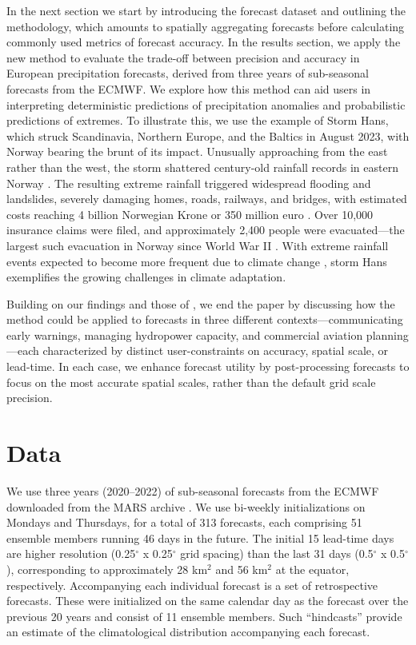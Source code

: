 \documentclass[preprint,12pt,authoryear]{elsarticle}
\begin{document}
In the next section we start by introducing the forecast dataset and outlining the methodology, which amounts to spatially aggregating forecasts before calculating commonly used metrics of forecast accuracy. In the results section, we apply the new method to evaluate the trade-off between precision and accuracy in European precipitation forecasts, derived from three years of sub-seasonal forecasts from the ECMWF. We explore how this method can aid users in interpreting deterministic predictions of precipitation anomalies and probabilistic predictions of extremes. To illustrate this, we use the example of Storm Hans, which struck Scandinavia, Northern Europe, and the Baltics in August 2023, with Norway bearing the brunt of its impact. Unusually approaching from the east rather than the west, the storm shattered century-old rainfall records in eastern Norway \citep{Granerod2023}. The resulting extreme rainfall triggered widespread flooding and landslides, severely damaging homes, roads, railways, and bridges, with estimated costs reaching 4 billion Norwegian Krone or 350 million euro \citep{Ekroll2023}. Over 10,000 insurance claims were filed, and approximately 2,400 people were evacuated—the largest such evacuation in Norway since World War II \citep{KLP2023}. With extreme rainfall events expected to become more frequent due to climate change \citep{Hanssen2009}, storm Hans exemplifies the growing challenges in climate adaptation. 


Building on our findings and those of \cite{RobertsLean2008}, we end the paper by discussing how the method could be applied to forecasts in three different contexts—communicating early warnings, managing hydropower capacity, and commercial aviation planning—each characterized by distinct user-constraints on accuracy, spatial scale, or lead-time. In each case, we enhance forecast utility by post-processing forecasts to focus on the most accurate spatial scales, rather than the default grid scale precision.



\section{Data}

We use three years (2020--2022) of sub-seasonal forecasts from the ECMWF \citep{Buizza2018} downloaded from the MARS archive \citep{MARS}. We use bi-weekly initializations on Mondays and Thursdays, for a total of 313 forecasts, each comprising 51 ensemble members running 46 days in the future. The initial 15 lead-time days are higher resolution (0.25$^{\circ}$ x 0.25$^{\circ}$ grid spacing) than the last 31 days (0.5$^{\circ}$ x 0.5$^{\circ}$), corresponding to approximately 28 km$^2$ and 56 km$^2$ at the equator, respectively. Accompanying each individual forecast is a set of retrospective forecasts. These were initialized on the same calendar day as the forecast over the previous 20 years and consist of 11 ensemble members. Such ``hindcasts'' provide an estimate of the climatological distribution accompanying each forecast. 
\end{document}
